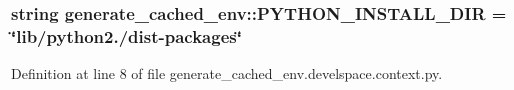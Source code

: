 \subsubsection[{\-P\-Y\-T\-H\-O\-N\-\_\-\-I\-N\-S\-T\-A\-L\-L\-\_\-\-D\-I\-R}]{\setlength{\rightskip}{0pt plus 5cm}string {\bf generate\-\_\-cached\-\_\-env\-::\-P\-Y\-T\-H\-O\-N\-\_\-\-I\-N\-S\-T\-A\-L\-L\-\_\-\-D\-I\-R} = \char`\"{}lib/python2./dist-\/packages\char`\"{}}\label{namespacegenerate__cached__env_a66c516fcf05ea353fc8b0881f150d624}


\-Definition at line 8 of file generate\-\_\-cached\-\_\-env.\-develspace.\-context.\-py.

